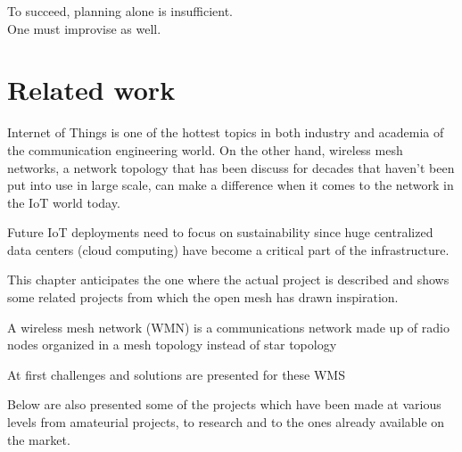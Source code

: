 
\begin{savequote}[70mm]
	To succeed, planning alone is insufficient.\\One must improvise as well.
\end{savequote}


\chapter{Related work}\label{chapter:related_work}

	Internet  of  Things  is  one  of  the  hottest  topics  in 
	both  industry  and  academia  of  the  communication  engineering 
	world.
	On  the  other  hand,  wireless  mesh  networks,  a  network 
	topology that has been discuss for decades that haven’t been put 
	into use in large scale, can make a difference when it comes to the 
	network  in  the  IoT  world  today.

	Future IoT deployments need to focus on sustainability
	since huge centralized data centers (cloud computing) have
	become a critical part of the infrastructure.

	This chapter anticipates the one where the actual project is described and shows some related projects from which the open mesh has drawn inspiration.
	
	A  wireless  mesh  network  (WMN)  is  a  communications 
	network made up of radio nodes organized in a mesh topology 
	instead of star topology
	\cite{wms}
	
	At first challenges and solutions are presented for these WMS
	
	Below are also presented some of the projects which have been made at various levels from amateurial projects, to research and to the ones already available on the market.
	
